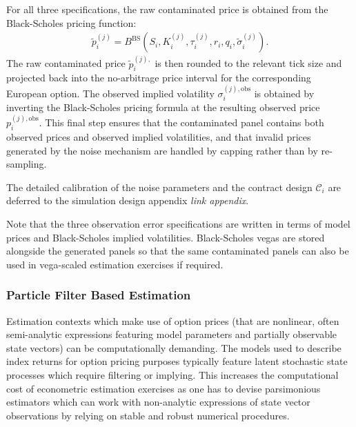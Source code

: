 \documentclass[11pt,a4paper,notitlepage]{article}
\numberwithin{equation}{section}
\begin{document}
For all three specifications, the raw contaminated price is obtained from the Black-Scholes pricing function:
\begin{align}
\tilde p_i^{(j)}
=
B^{\mathrm{BS}}
\left(
S_i,K_i^{(j)},\tau_i^{(j)},r_i,q_i,\tilde\sigma_i^{(j)}
\right).
\label{eq:raw_contaminated_price}
\end{align}
The raw contaminated price $\tilde p_i^{(j),}$ is then rounded to the relevant tick size and projected back into the no-arbitrage price interval for the corresponding European option. The observed implied volatility $\sigma_i^{(j),\mathrm{obs}}$ is obtained by inverting the Black-Scholes pricing formula at the resulting observed price $p_i^{(j),\mathrm{obs}}$. This final step ensures that the contaminated panel contains both observed prices and observed implied volatilities, and that invalid prices generated by the noise mechanism are handled by capping rather than by re-sampling.

The detailed calibration of the noise parameters and the contract design $\mathcal{C}_i$ are deferred to the simulation design appendix \emph{link appendix}.

Note that the three observation error specifications are written in terms of model prices and Black-Scholes implied volatilities. Black-Scholes vegas are stored alongside the generated panels so that the same contaminated panels can also be used in vega-scaled estimation exercises if required.
 
\subsubsection{Particle Filter Based Estimation}
Estimation contexts which make use of option prices (that are nonlinear, often semi-analytic expressions featuring model parameters and partially observable state vectors) can be computationally demanding. The models used to describe index returns for option pricing purposes typically feature latent stochastic state processes which require filtering  or implying. This increases the computational cost of econometric estimation exercises as one has to devise parsimonious estimators which can work with non-analytic expressions of state vector observations by relying on stable and robust numerical procedures. 

\end{document}
